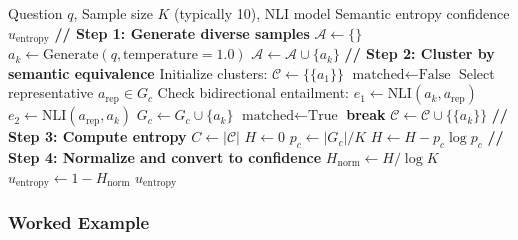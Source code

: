 \documentclass[12pt,a4paper]{article}
\theoremstyle{definition}
\begin{document}
\begin{algorithm}[htbp]
\caption{Semantic Entropy Computation}
\begin{algorithmic}[1]
\Require Question $q$, Sample size $K$ (typically 10), NLI model
\Ensure Semantic entropy confidence $u_{\text{entropy}}$
\State
\State \textbf{// Step 1: Generate diverse samples}
\State $\mathcal{A} \gets \{\}$
    \State $a_k \gets \text{Generate}(q, \text{temperature}=1.0)$ 
    \State $\mathcal{A} \gets \mathcal{A} \cup \{a_k\}$
\EndFor
\State
\State \textbf{// Step 2: Cluster by semantic equivalence}
\State Initialize clusters: $\mathcal{C} \gets \{\{a_1\}\}$ 
    \State $\text{matched} \gets \text{False}$
        \State Select representative $a_{\text{rep}} \in G_c$
        \State Check bidirectional entailment:
        \State \quad $e_1 \gets \text{NLI}(a_k, a_{\text{rep}})$ 
        \State \quad $e_2 \gets \text{NLI}(a_{\text{rep}}, a_k)$ 
            \State $G_c \gets G_c \cup \{a_k\}$ 
            \State $\text{matched} \gets \text{True}$
            \State \textbf{break}
        \EndIf
    \EndFor
        \State $\mathcal{C} \gets \mathcal{C} \cup \{\{a_k\}\}$ 
    \EndIf
\EndFor
\State
\State \textbf{// Step 3: Compute entropy}
\State $C \gets |\mathcal{C}|$ 
\State $H \gets 0$
    \State $p_c \gets |G_c| / K$ 
    \State $H \gets H - p_c \log p_c$
\EndFor
\State
\State \textbf{// Step 4: Normalize and convert to confidence}
\State $H_{\text{norm}} \gets H / \log K$ 
\State $u_{\text{entropy}} \gets 1 - H_{\text{norm}}$ 
\State
\State \Return $u_{\text{entropy}}$
\end{algorithmic}
\end{algorithm}

\subsubsection{Worked Example}
\end{document}
